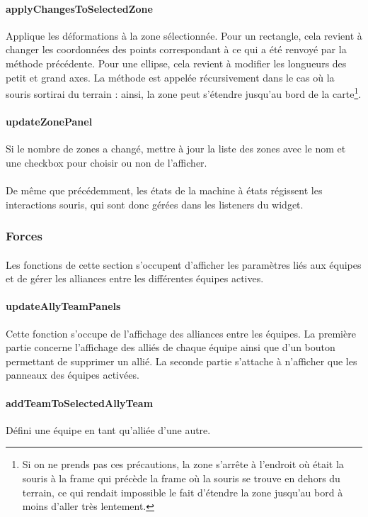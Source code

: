 \documentclass[a4paper]{article}
\begin{document}
\paragraph{applyChangesToSelectedZone} Applique les déformations à la zone sélectionnée. Pour un rectangle, cela revient à changer les coordonnées des points correspondant à ce qui a été renvoyé par la méthode précédente. Pour une ellipse, cela revient à modifier les longueurs des petit et grand axes. La méthode est appelée récursivement dans le cas où la souris sortirai du terrain : ainsi, la zone peut s'étendre jusqu'au bord de la carte\footnote{Si on ne prends pas ces précautions, la zone s'arrête à l'endroit où était la souris à la frame qui précède la frame où la souris se trouve en dehors du terrain, ce qui rendait impossible le fait d'étendre la zone jusqu'au bord à moins d'aller très lentement.}.
\paragraph{updateZonePanel} Si le nombre de zones a changé, mettre à jour la liste des zones avec le nom et une checkbox pour choisir ou non de l'afficher.
\paragraph{}
De même que précédemment, les états de la machine à états régissent les interactions souris, qui sont donc gérées dans les listeners du widget.
\subsubsection{Forces}
\paragraph{}
Les fonctions de cette section s'occupent d'afficher les paramètres liés aux équipes et de gérer les alliances entre les différentes équipes actives.
\paragraph{updateAllyTeamPanels} Cette fonction s'occupe de l'affichage des alliances entre les équipes. La première partie concerne l'affichage des alliés de chaque équipe ainsi que d'un bouton permettant de supprimer un allié. La seconde partie s'attache à n'afficher que les panneaux des équipes activées.
\paragraph{addTeamToSelectedAllyTeam} Défini une équipe en tant qu'alliée d'une autre.
\end{document}
